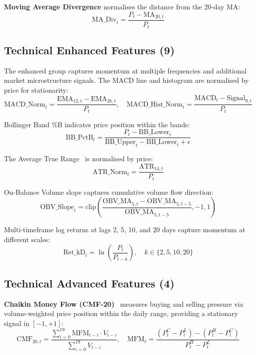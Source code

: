 \documentclass[10pt,a4paper,twoside]{article}
\begin{document}
\textbf{Moving Average Divergence} normalises the distance from the 20-day MA:
\begin{equation}
  \text{MA\_Div}_t = \frac{P_t - \text{MA}_{20,t}}{P_t}
\end{equation}

\subsection{Technical Enhanced Features (9)}

The enhanced group captures momentum at multiple frequencies and additional
market microstructure signals. The MACD line and histogram are normalised by
price for stationarity:
\begin{equation}
  \text{MACD\_Norm}_t = \frac{\text{EMA}_{12,t} - \text{EMA}_{26,t}}{P_t}, \quad
  \text{MACD\_Hist\_Norm}_t = \frac{\text{MACD}_t - \text{Signal}_{9,t}}{P_t}
\end{equation}

Bollinger Band \%B indicates price position within the bands:
\begin{equation}
  \text{BB\_PctB}_t = \frac{P_t - \text{BB\_Lower}_t}{\text{BB\_Upper}_t - \text{BB\_Lower}_t + \epsilon}
\end{equation}

The Average True Range~\cite{wilder1978} is normalised by price:
\begin{equation}
  \text{ATR\_Norm}_t = \frac{\text{ATR}_{14,t}}{P_t}
\end{equation}

On-Balance Volume slope captures cumulative volume flow direction:
\begin{equation}
  \text{OBV\_Slope}_t = \text{clip}\!\left(\frac{\text{OBV\_MA}_{5,t} - \text{OBV\_MA}_{5,t-5}}{\text{OBV\_MA}_{5,t-5}}, -1, 1\right)
\end{equation}

Multi-timeframe log returns at lags 2, 5, 10, and 20 days capture momentum at
different scales:
\begin{equation}
  \text{Ret\_kD}_t = \ln\!\left(\frac{P_t}{P_{t-k}}\right), \quad k \in \{2, 5, 10, 20\}
\end{equation}

\subsection{Technical Advanced Features (4)}

\textbf{Chaikin Money Flow (CMF-20)}~\cite{chaikin1978} measures buying and
selling pressure via volume-weighted price position within the daily range,
providing a stationary signal in $[-1, +1]$:
\begin{equation}
  \text{CMF}_{20,t} = \frac{\sum_{i=0}^{19} \text{MFM}_{t-i} \cdot V_{t-i}}
                          {\sum_{i=0}^{19} V_{t-i}}, \quad
  \text{MFM}_t = \frac{(P_t^C - P_t^L) - (P_t^H - P_t^C)}{P_t^H - P_t^L}
\end{equation}
\end{document}
